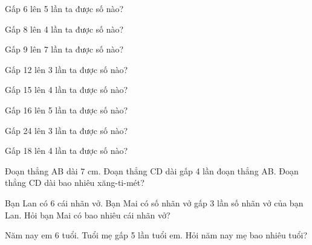 \begin{ex}
Gấp 6 lên 5 lần ta được số nào?
\end{ex}

\begin{ex}
Gấp 8 lên 4 lần ta được số nào?
\end{ex}

\begin{ex}
Gấp 9 lên 7 lần ta được số nào?
\end{ex}

\begin{ex}
Gấp 12 lên 3 lần ta được số nào?
\end{ex}

\begin{ex}
Gấp 15 lên 4 lần ta được số nào?
\end{ex}

\begin{ex}
Gấp 16 lên 5 lần ta được số nào?
\end{ex}

\begin{ex}
Gấp 24 lên 3 lần ta được số nào?
\end{ex}

\begin{ex}
Gấp 18 lên 4 lần ta được số nào?
\end{ex}

\begin{ex}
Đoạn thẳng AB dài 7 cm. Đoạn thẳng CD dài gấp 4 lần đoạn thẳng AB. Đoạn thẳng CD dài bao nhiêu xăng-ti-mét?
\end{ex}

\begin{ex}
Bạn Lan có 6 cái nhãn vở. Bạn Mai có số nhãn vở gấp 3 lần số nhãn vở của bạn Lan. Hỏi bạn Mai có bao nhiêu cái nhãn vở?
\end{ex}

\begin{ex}
Năm nay em 6 tuổi. Tuổi mẹ gấp 5 lần tuổi em. Hỏi năm nay mẹ bao nhiêu tuổi?
\end{ex}

